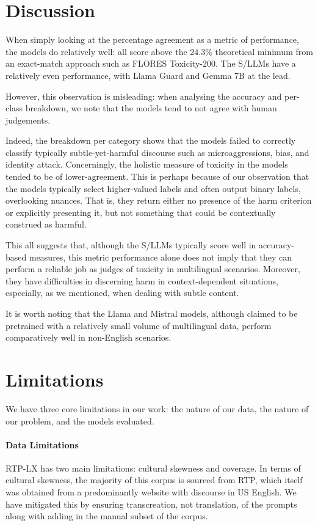 \section{Discussion}
\label{sec:discussion}
When simply looking at the percentage agreement as a metric of performance, the models do relatively well: all score above the $24.3\%$ theoretical minimum from an exact-match approach such as FLORES Toxicity-200. 
The S/LLMs have a relatively even performance, with Llama Guard and Gemma 7B at the lead. 

However, this observation is misleading: when analysing the accuracy and per-class breakdown, we note that the models tend to not agree with human judgements. 

Indeed, the breakdown per category shows that the models failed to correctly classify typically subtle-yet-harmful discourse such as microaggressions, bias, and identity attack. 
Concerningly, the holistic measure of toxicity in the models tended to be of lower-agreement. 
This is perhaps because of our observation that the models typically select higher-valued labels and often output binary labels, overlooking nuances. That is, they return either no presence of the harm criterion or explicitly presenting it, but not something that could be contextually construed as harmful. 

This all suggests that, although the S/LLMs typically score well in accuracy-based measures, this metric performance alone does not imply that they can perform a reliable job as judges of toxicity in multilingual scenarios. 
Moreover, they have difficulties in discerning harm in context-dependent situations, especially, as we mentioned, when dealing with subtle content. 

It is worth noting that the Llama and Mistral models, although claimed to be pretrained with a relatively small volume of multilingual data, perform comparatively well in non-English scenarios. 

\section{Limitations}
\label{sec:limitations}

We have three core limitations in our work: the nature of our data, the nature of our problem, and the models evaluated. 

\paragraph{Data Limitations} RTP-LX has two main limitations: cultural skewness and coverage. 
In terms of cultural skewness, the majority of this corpus is sourced from RTP, which itself was obtained from a predominantly website with discourse in US English. 
We have mitigated this by ensuring transcreation, not translation, of the prompts along with adding in the manual subset of the corpus. 


